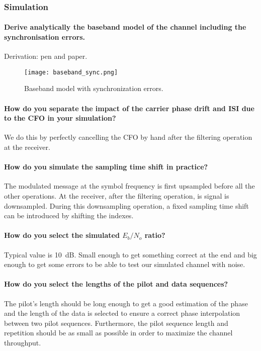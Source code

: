 \subsubsection{Simulation}

\paragraph{Derive analytically the baseband model of the channel including the synchronisation errors.}
Derivation: pen and paper.
\begin{figure}[htbp]
\texttt{[image: baseband\_sync.png]}
\caption{Baseband model with synchronization errors.\label{fig:sync}}
\end{figure}


\paragraph{How do you separate the impact of the carrier phase drift and ISI due to the CFO in your simulation?}
We do this by perfectly cancelling the CFO by hand after the filtering operation at the receiver.

\paragraph{How do you simulate the sampling time shift in practice?}The modulated message at the symbol frequency is first upsampled before all the other operations.
At the receiver, after the filtering operation, is signal is downsampled.
During this downsampling operation, a fixed sampling time shift can be introduced by shifting the indexes.

\paragraph{How do you select the simulated $E_{b}/N_{o}$ ratio?} Typical value is \SI{10}{\deci\bel}. Small enough to get something correct at the end and big enough to get some errors to be able to test our simulated channel with noise.

\paragraph{How do you select the lengths of the pilot and data sequences?} The pilot's length should be long enough to get a good estimation of the phase and the length of the data is selected to ensure a correct phase interpolation between two pilot sequences. Furthermore, the pilot sequence length and repetition should be as small as possible in order to maximize the channel throughput.

